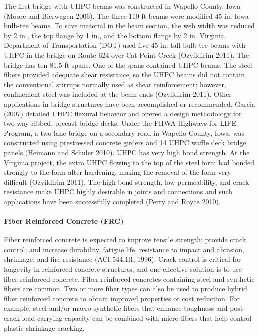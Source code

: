 The first bridge with UHPC beams was constructed in Wapello County, Iowa (Moore and Bierwagen 2006). The
three 110-ft beams were modified 45-in. Iowa bulb-tee beams. To save material in the beam section, the web width
was reduced by 2 in., the top flange by 1 in., and the bottom flange by 2 in. Virginia Department of Transportation
(DOT) used five 45-in.-tall bulb-tee beams with UHPC in the bridge on Route 624 over Cat Point Creek (Ozyildirim
2011). The bridge has ten 81.5-ft spans. One of the spans contained UHPC beams. The steel fibers provided adequate
shear resistance, so the UHPC beams did not contain the conventional stirrups normally used as shear reinforcement;
however, confinement steel was included at the beam ends (Ozyildirim 2011). Other applications in bridge structures
have been accomplished or recommended. Garcia (2007) detailed UHPC flexural behavior and offered a design
methodology for two-way ribbed, precast bridge decks. Under the FHWA Highways for LIFE Program, a two-lane
bridge on a secondary road in Wapello County, Iowa, was constructed using prestressed concrete girders and 14
UHPC waffle deck bridge panels (Heimann and Schuler 2010). UHPC has very high bond strength. At the Virginia
project, the extra UHPC flowing to the top of the steel form had bonded strongly to the form after hardening, making the removal of the form very difficult (Ozyildirim 2011). The high bond strength, low permeability, and crack
resistance make UHPC highly desirable in joints and connections and such applications have been successfully
completed (Perry and Royce 2010).

\paragraph{Fiber Reinforced Concrete (FRC)}
Fiber reinforced concrete is expected to improve tensile strength; provide crack control; and increase durability,
fatigue life, resistance to impact and abrasion, shrinkage, and fire resistance (ACI 544.1R, 1996). Crack control is
critical for longevity in reinforced concrete structures, and one effective solution is to use fiber reinforced concrete.
Fiber reinforced concretes containing steel and synthetic fibers are common. Two or more fiber types can also be
used to produce hybrid fiber reinforced concrete to obtain improved properties or cost reduction. For example, steel
and/or macro-synthetic fibers that enhance toughness and post-crack load-carrying capacity can be combined with
micro-fibers that help control plastic shrinkage cracking.

